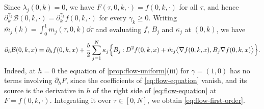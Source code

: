 \begin{remark}[The coefficients at $h=0$]\label{rem:flow-first-order}
Since $\lambda_j(0,k)=0$, we have $F(\tau,0,k,\cdot)=f(0,k,\cdot)$ for all
$\tau$, and hence $\partial_k^{\gamma_k}\mathcal B(0,k,\cdot)=\partial_k^{\gamma_k}f(0,k,\cdot)$ for
every $\gamma_k\ge0$.
Writing $\bar m_j(k)=\int_0^1m_j(\tau,0,k)\dd\tau$ and evaluating $f$, $B_j$ and
$\kappa_j$ at $(0,k)$, we have
\begin{equation}\label{eq:flow-first-order}
 \partial_h\mathcal B(0,k,x)=\partial_hf(0,k,x)+\frac b2\sum_{j=1}^N\kappa_j
 \Bigl\{B_j\mathbin{:}D^2f(0,k,x)
 +\bar m_j\bigl\langle\nabla f(0,k,x),B_j\nabla f(0,k,x)\bigr\rangle\Bigr\}.
\end{equation}
Indeed, at $h=0$ the equation of \cref{prop:flow-uniform}(iii) for
$\gamma=(1,0)$ has no terms involving $\partial_hF$, since the coefficients of
\eqref{eq:flow-equation} vanish, and its source is the derivative in $h$ of the
right side of \eqref{eq:flow-equation} at $F=f(0,k,\cdot)$. Integrating it over
$\tau\in[0,N]$, we obtain \eqref{eq:flow-first-order}.
\end{remark}

